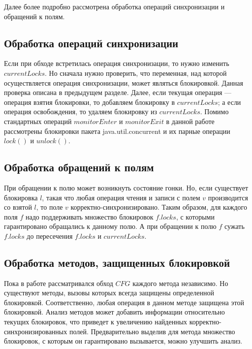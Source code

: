 \FloatBarrier

Далее более подробно рассмотрена обработка операций синхронизации и обращений к полям.

\subsection{Обработка операций синхронизации}
Если при обходе встретилась операция синхронизации, то нужно изменить $currentLocks$. Но сначала нужно проверить, что переменная, над которой осуществляется операция синхронизации, может являться блокировкой. Данная проверка описана в предыдущем разделе. Далее, если текущая операция --- операция взятия блокировки, то добавляем блокировку в $currentLocks$; а если операция освобождения, то удаляем блокировку из $currentLocks$. Помимо стандартных операций $monitorEnter$ и $monitorExit$ в данной работе рассмотрены блокировки пакета java.util.concurrent и их парные операции $lock()$ и $unlock()$.

\subsection{Обработка обращений к полям}
При обращении к полю может возникнуть состояние гонки. Но, если существует блокировка $l$, такая что любая операция чтения  и записи с полем $v$ производится со взятой $l$, то поле $v$ корректно-синхронизировано. Таким образом, для каждого поля $f$ надо поддерживать множество блокировок $f.locks$, с которыми гарантировано обращались к данному полю. А при обращении к полю $f$ сужать $f.locks$ до пересечения $f.locks$ и $currentLocks$. 


\subsection{Обработка методов, защищенных блокировкой}
Пока в работе рассматривался обход $CFG$ каждого метода независимо. Но существуют методы, вызовы которых  всегда защищены определенной блокировкой. Соответственно, любая операция в данном методе защищена этой блокировкой. Анализ методов может добавить информации относительно текущих блокировок, что приведет к увеличению найденных корректно-синхронизированных полей. Предварительно выделив для метода множество блокировок, с которым он гарантировано вызывается, можно улучшить анализ.



